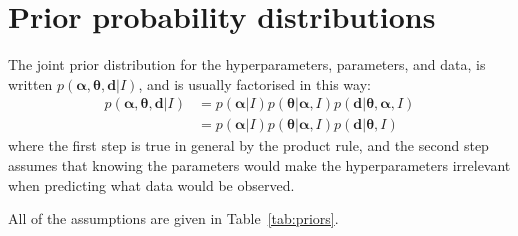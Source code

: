 \documentclass[a4paper, 12pt]{article}
\newcommand{\hypers}{\boldsymbol{\alpha}}
\newcommand{\params}{\boldsymbol{\theta}}
\newcommand{\data}{\boldsymbol{d}}
\newcommand{\info}{I}
\begin{document}
\section{Prior probability distributions}\label{sec:priors}
The joint prior distribution for the hyperparameters, parameters, and data,
is written $p(\hypers, \params, \data | \info)$, and is usually factorised
in this way:
\begin{align}
p(\hypers, \params, \data | \info) &=
    p(\hypers | \info)p(\params | \hypers, \info)
    p(\data | \params, \hypers, \info)\\
    &= p(\hypers | \info)p(\params | \hypers, \info)
    p(\data | \params, \info)
\end{align}
where the first step is true in general by the product rule, and the second
step assumes that knowing the parameters would make the hyperparameters
irrelevant when predicting what data would be observed.

All of the assumptions are given in Table~\ref{tab:priors}.
\end{document}
